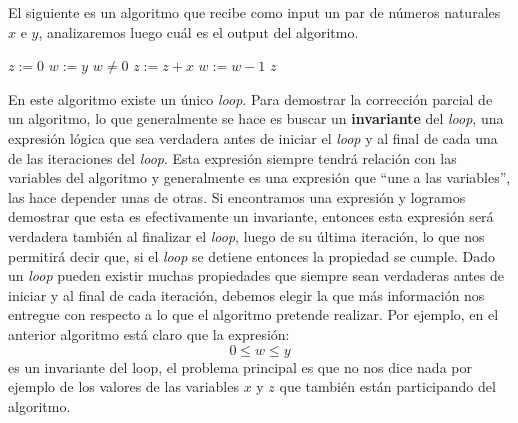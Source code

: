 El siguiente es un algoritmo que recibe como input un par de números naturales $x$ e $y$, analizaremos luego cuál es el output del algoritmo.
\begin{codebox}
\li $z:=0$
\li $w:=y$
\li \While $w \not= 0$ \Do
\li \> $z:=z+x$
\li \> $w:=w-1$
\li \Return $z$
\end{codebox}

En este algoritmo existe un único \emph{loop}.
Para demostrar la corrección parcial de un algoritmo, lo que generalmente se hace es buscar un {\bf invariante} del \emph{loop}, una expresión lógica que sea verdadera antes de iniciar el \emph{loop} y al final de cada una de las iteraciones del \emph{loop}.
Esta expresión siempre tendrá relación con las variables del algoritmo y generalmente es una expresión que ``une a las variables'', las hace depender unas de otras.
Si encontramos una expresión y logramos demostrar que esta es efectivamente un invariante, entonces esta expresión será verdadera también al finalizar el \emph{loop}, luego de su última iteración, lo que nos permitirá decir que, si el \emph{loop} se detiene entonces la propiedad se cumple.
Dado un \emph{loop} pueden existir muchas propiedades que siempre sean verdaderas antes de iniciar y al final de cada iteración, debemos elegir la que más información nos entregue con respecto a lo que el algoritmo pretende realizar.
Por ejemplo, en el anterior algoritmo está claro que la expresión:
\[
0\leq w\leq y
\]
es un invariante del loop, el problema principal es que no nos dice nada por ejemplo de los valores de las variables $x$ y $z$ que también están participando del algoritmo.

